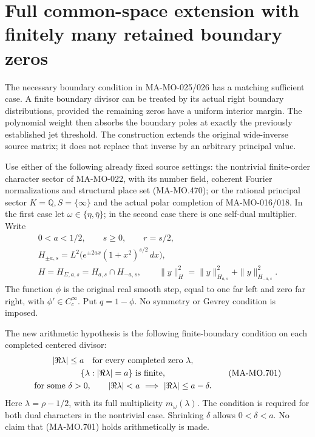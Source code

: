 \section{Full common-space extension with finitely many retained boundary zeros}
\label{sec:finite-boundary-full-matrix}

The necessary boundary condition in MA-MO-025/026 has a matching
sufficient case. A finite boundary divisor can be treated by its
actual right boundary distributions, provided the remaining zeros
have a uniform interior margin. The polynomial weight then absorbs
the boundary poles at exactly the previously established jet
threshold. The construction extends the original wide-inverse
source matrix; it does not replace that inverse by an arbitrary
principal value.

Use either of the following already fixed source settings:
the nontrivial finite-order character sector of MA-MO-022, with
its number field, coherent Fourier normalizations and structural
place set (MA-MO.470); or the rational principal sector
\(K=\mathbb Q,S=\{\infty\}\) and the actual polar completion
of MA-MO-016/018. In the first case let
\(\omega\in\{\eta,\bar\eta\}\); in the second case there is
one self-dual multiplier. Write
\[
 \begin{gathered}
 0<a<1/2,\qquad s\ge0,\qquad r=s/2,\\
 H_{\pm a,s}
   =L^2\bigl(e^{\pm2ax}(1+x^2)^{s/2}\,dx\bigr),\\
 H=H_{\Sigma,a,s}=H_{a,s}\cap H_{-a,s},\qquad
 \|y\|_H^2=\|y\|_{H_{a,s}}^2+\|y\|_{H_{-a,s}}^2 .
 \end{gathered}
 \tag{MA-MO.700}
\]
The function \(\phi\) is the original real smooth step,
equal to one far left and zero far right, with
\(\phi'\in C_c^\infty\). Put \(q=1-\phi\). No symmetry
or Gevrey condition is imposed.

The new arithmetic hypothesis is the following finite-boundary
condition on each completed centered divisor:
\[
 \begin{gathered}
 |\Re\lambda|\le a\quad\hbox{for every completed zero }\lambda,\\
 \{\lambda:|\Re\lambda|=a\}\ \hbox{is finite},\\
 \text{for some }\delta>0,\qquad
 |\Re\lambda|<a\ \Longrightarrow\
                       |\Re\lambda|\le a-\delta .
 \end{gathered}
 \tag{MA-MO.701}
\]
Here \(\lambda=\rho-1/2\), with its full multiplicity
\(m_\omega(\lambda)\). The condition is required for both
dual characters in the nontrivial case. Shrinking \(\delta\)
allows \(0<\delta<a\). No claim that (MA-MO.701) holds
arithmetically is made.

